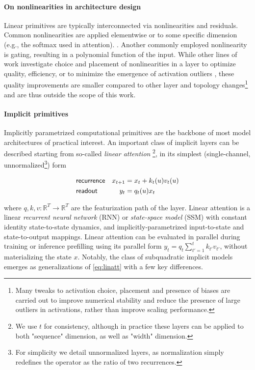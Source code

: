 \paragraph{On nonlinearities in architecture design}

Linear primitives are typically interconnected via nonlinearities and residuals. Common nonlinearities are applied elementwise or to some specific dimension (e.g., the softmax used in attention). \cite{lin2017structured,vaswani2017attention}. Another commonly employed nonlinearity is gating, resulting in a polynomial function of the input. While other lines of work investigate choice and placement of nonlinearities in a layer to optimize quality, efficiency, or to minimize the emergence of activation outliers \cite{so2021primer}, these quality improvements are smaller compared to other layer and topology changes\footnote{Many tweaks to activation choice, placement and presence of biases are carried out to improve numerical stability and reduce the presence of large outliers in activations, rather than improve scaling performance.} and are thus outside the scope of this work.

\paragraph{Implicit primitives}

Implicitly parametrized computational primitives are the backbone of most model architectures of practical interest. An important class of implicit layers can be described starting from so-called \textit{linear attention} \cite{katharopoulos2020transformers,schlag2021linear,hua2022transformer}\footnote{We use $t$ for consistency, although in practice these layers can be applied to both "sequence" dimension, as well as "width" dimension.}, in its simplest (single-channel, unnormalized\footnote{For simplicity we detail unnormalized layers, as normalization simply redefines the operator as the ratio of two recurrences.}) form

\begin{equation}\label{eq:linatt}
    \begin{aligned}   
    &{\sf recurrence} &x_{t+1} &= x_{t} + k_{t}(u) v_{t}(u) \\ 
    &{\sf readout} &y_{t} &= q_{t}(u) x_{t}
    \end{aligned}
\end{equation}

where $q, k, v: \mathbb{R}^T \rightarrow \mathbb{R}^T$ are the featurization path of the layer. Linear attention is a linear \textit{recurrent neural network} (RNN) or \textit{state-space model} (SSM) with constant identity state-to-state dynamics, and implicitly-parametrized input-to-state and state-to-output mappings. Linear attention can be evaluated in parallel during training or inference prefilling using its parallel form $y_t = q_t \sum_{t'=1}^t k_{t'} v_{t'}$, without materializing the state $x$. Notably, the class of subquadratic implicit models \cite{poli2023hyena,gu2023mamba,yang2023gated} emerges as generalizations of \eqref{eq:linatt} with a few key differences.

